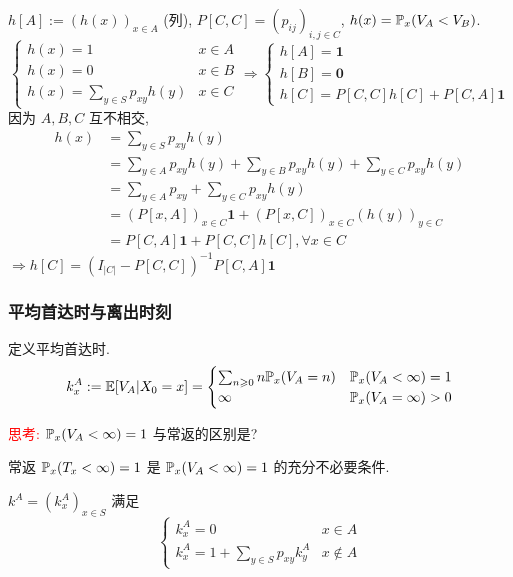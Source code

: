 $h[A]:=(h(x))_{x\in A}$ (列), $P[C,C]=(p_{ij})_{i,j\in C}$, $h(x)=\mathbb{P}_x(V_A<V_B)$.
\[
\begin{cases}
h(x)=1 & x\in A\\
h(x)=0 & x\in B\\
h(x)=\sum_{y\in S}p_{xy}h(y) & x\in C
\end{cases}\Rightarrow 
\begin{cases}
    h[A]=\mathbf{1}\\
    h[B]=\mathbf{0}\\
    h[C]=P[C,C]h[C]+P[C,A]\mathbf{1}
\end{cases}
\]
因为 $A,B,C$ 互不相交, 
\[
\begin{aligned}
h(x)&=\sum_{y\in S}p_{xy}h(y)\\
&=\sum_{y\in A}p_{xy}h(y)+\sum_{y\in B}p_{xy}h(y)+\sum_{y\in C}p_{xy}h(y)\\
&=\sum_{y\in A}p_{xy}+\sum_{y\in C}p_{xy}h(y)\\
&=(P[x,A])_{x\in C}\mathbf{1}+(P[x,C])_{x\in C}(h(y))_{y\in C}\\
&=P[C,A]\mathbf{1}+P[C,C]h[C],\forall x\in C
\end{aligned}
\]
$\Rightarrow h[C]=(I_{|C|}-P[C,C])^{-1}P[C,A]\mathbf{1}$

\subsubsection{平均首达时与离出时刻}

\begin{definition}
    定义平均首达时.
    \[
    k_x^A:=\mathbb E[V_A|X_0=x]=\begin{cases}
        \sum_{n\geqslant 0}n\mathbb{P}_x(V_A=n) & \mathbb{P}_x(V_A<\infty)=1\\
        \infty & \mathbb{P}_x(V_A=\infty)>0
    \end{cases}
    \]
\end{definition}
\textcolor{red}{思考:} $\mathbb{P}_x(V_A<\infty)=1$ 与常返的区别是? 

常返 $\mathbb{P}_x(T_x<\infty)=1$ 是 $\mathbb{P}_x(V_A<\infty)=1$ 的充分不必要条件.

\begin{lemma}
    $k^A=(k_x^A)_{x\in S}$ 满足
    \[
    \begin{cases}
        k_x^A=0 & x\in A\\
        k_x^A=1+\sum_{y\in S}p_{xy}k_y^A & x\notin A
    \end{cases}
    \]
\end{lemma}

